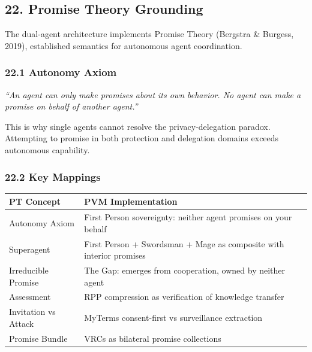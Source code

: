 \documentclass[
]{article}
\newcounter{none} %
\begin{document}
\subsection{22. Promise Theory
Grounding}\label{promise-theory-grounding}

The dual-agent architecture implements Promise Theory (Bergstra \&
Burgess, 2019), established semantics for autonomous agent coordination.

\subsubsection{22.1 Autonomy Axiom}\label{autonomy-axiom}

\emph{``An agent can only make promises about its own behavior. No agent
can make a promise on behalf of another agent.''}

This is why single agents cannot resolve the privacy-delegation paradox.
Attempting to promise in both protection and delegation domains exceeds
autonomous capability.

\subsubsection{22.2 Key Mappings}\label{key-mappings}

{\def\LTcaptype{none} %
\begin{longtable}[]{@{}
  >{\raggedright\arraybackslash}p{}
  >{\raggedright\arraybackslash}p{}@{}}
\toprule\noalign{}
\begin{minipage}[b]{\linewidth}\raggedright
PT Concept
\end{minipage} & \begin{minipage}[b]{\linewidth}\raggedright
PVM Implementation
\end{minipage} \\
\midrule\noalign{}
\endhead
\bottomrule\noalign{}
\endlastfoot
Autonomy Axiom & First Person sovereignty: neither agent promises on
your behalf \\
Superagent & First Person + Swordsman + Mage as composite with interior
promises \\
Irreducible Promise & The Gap: emerges from cooperation, owned by
neither agent \\
Assessment & RPP compression as verification of knowledge transfer \\
Invitation vs Attack & MyTerms consent-first vs surveillance
extraction \\
Promise Bundle & VRCs as bilateral promise collections \\
\end{longtable}
}
\end{document}
